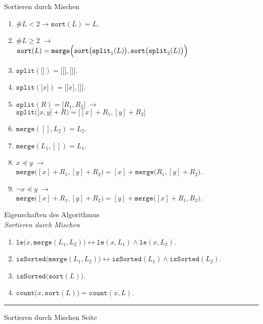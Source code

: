\documentclass{slides}
\newcounter{mypage}
\begin{document}
\begin{slide}{}
\normalsize

\begin{center}
Sortieren durch Mischen
\end{center}
\vspace*{0.5cm}

\footnotesize
\begin{enumerate}
\item $\#L < 2 \rightarrow \mathtt{sort}(L) = L$.
\item $\#L \geq 2 \;\rightarrow $ \\
      $ \mathtt{sort}(L) = \mathtt{merge}\Bigl(\mathtt{sort}\bigl(\mathtt{split}_1(L)\bigr), \mathtt{sort}\bigl(\mathtt{split}_2(L)\bigr)\Bigr)$
\item $\mathtt{split}(\texttt{[]}) = \mathtt{[} \texttt{[]}, \texttt{[]} \mathtt{]}$.
\item $\mathtt{split}(\mathtt{[}x\mathtt{]}) = \mathtt{[} \texttt{[}x\texttt{]}, \texttt{[]} \mathtt{]}$.
\item $\mathtt{split}(R) = \mathtt{[}R_1, R_2\mathtt{]} \;\rightarrow$ \\
      $\mathtt{split}\bigl(\mathtt{[}x, y\mathtt{]} + R\bigr) = \bigl[ [x] + R_1, [y] + R_2 \bigr]$
\item $\mathtt{merge}([], L_2) = L_2$.

\item $\mathtt{merge}(L_1, []) = L_1$.

\item $x \preceq y \;\rightarrow$ \\
      $\mathtt{merge}\bigl([x]+R_1, [y]+R_2\bigr) = [x] + \mathtt{merge}\bigl(R_1,[y]+R_2\bigr)$.

\item $\neg x \preceq y \;\rightarrow$ \\ 
      $\mathtt{merge}\bigl([x]+R_1, [y]+R_2\bigr) = [y] + \mathtt{merge}\bigl([x] + R_1,R_2\bigr)$.
\end{enumerate}

\begin{center}
{\normalsize
Eigenschaften des Algorithmus \\ \emph{Sortieren durch Mischen}}
\end{center}

\begin{enumerate}
\item $\texttt{le}\bigl(x,\texttt{merge}(L_1,L_2)\bigr) \leftrightarrow \texttt{le}(x,L_1) \wedge \mathtt{le}(x,L_2)$.
\item $\texttt{isSorted}\bigl(\texttt{merge}(L_1,L_2)\bigr) \leftrightarrow \mathtt{isSorted}(L_1) \wedge \mathtt{isSorted}(L_2)$.
\item $\mathtt{isSorted}\bigl(\mathtt{sort}(L)\bigr)$.
\item $\mathtt{count}\bigl(x,\mathtt{sort}(L)\bigr) = \mathtt{count}(x,L)$.
\end{enumerate}

\vspace*{\fill}
\tiny \addtocounter{mypage}{1}
\rule{17cm}{1mm}
Sortieren durch Mischen \hspace*{\fill} Seite 
\end{slide}
\end{document}
